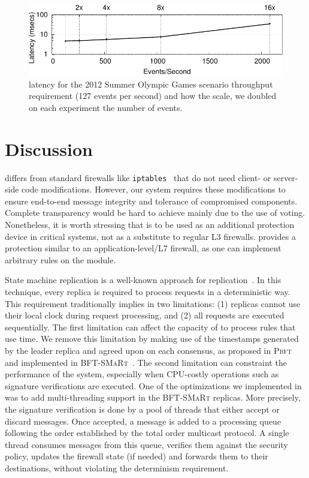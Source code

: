 \begin{figure}[t]
\centering
\includegraphics[width=\columnwidth]{images/gnuplot/sieveq/new_massif/massif.pdf}
\caption{\sieveq latency for the 2012 Summer Olympic Games scenario throughput requirement (127 events per second) and how the \sieveq scale, we doubled on each experiment the number of events.}
\label{fig:massif}
\end{figure}

\section{Discussion}
\label{discussion}

\sieveq differs from standard firewalls like \texttt{iptables}~\cite{iptables} that do not need client- or server-side code modifications.
However, our system requires these modifications to ensure end-to-end message integrity and tolerance of compromised components.
Complete transparency would be hard to achieve mainly due to the use of voting.
Nonetheless, it is worth stressing that \sieveq is to be used as an additional protection device in critical systems, not as a substitute to regular L3 firewalls.
\sieveq provides a protection similar to an application-level/L7 firewall, as one can implement arbitrary rules on the \repsieve module.


State machine replication is a well-known approach for replication~\cite{Schneider:1990}.
In this technique, every replica is required to process requests in a deterministic way.
This requirement traditionally implies in two limitations: (1) replicas cannot use their local clock during request processing, and (2) all requests are executed sequentially.
The first limitation can affect the capacity of \sieveq to process rules that use time.
We remove this limitation by making use of the timestamps generated by the leader replica and agreed upon on each consensus, as proposed in \textsc{Pbft}~\cite{Castro:2002} and implemented in \textsc{BFT-SMaRt}~\cite{Bessani:2014}.
The second limitation can constraint the performance of the system, especially when CPU-costly operations such as signature verifications are executed.
One of the optimizations we implemented in \sieveq was to add multi-threading support in the \textsc{BFT-SMaRt} replicas.
More precisely, the signature verification is done by a pool of threads that either accept or discard messages.
Once accepted, a message is added to a processing queue following the order established by the total order multicast protocol.
A single thread consumes messages from this queue, verifies them against the security policy, updates the firewall state (if needed) and forwards them to their destinations, without violating the determinism requirement.



